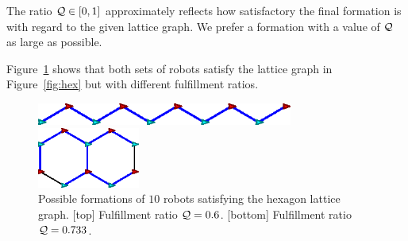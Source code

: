 The ratio $\mathcal{Q} \in [0, 1]$ approximately reflects how satisfactory the final formation is with regard to the given lattice graph. 
%
We prefer a formation with a value of $\mathcal{Q}$ as large as possible.

Figure~\ref{fig:hex-qual} shows that both sets of robots satisfy the lattice
graph in Figure~\ref{fig:hex} but with different fulfillment ratios.
\begin{figure}  
    \centering
    \begin{minipage}[b]{0.95\linewidth}
        \centering
        \includegraphics[width=0.75\textwidth]{figs/bad-hexagon}
        
    \end{minipage}
    \begin{minipage}[b]{0.95\linewidth}
        \centering
        \includegraphics[width=0.3\textwidth]{figs/good-hexagon}
    \end{minipage}
    \caption{Possible formations of $10$ robots satisfying the hexagon lattice graph. [top] Fulfillment ratio $\mathcal{Q}=0.6$. 
    [bottom] Fulfillment ratio $\mathcal{Q} = 0.733$.}
    \label{fig:hex-qual}
\end{figure}

